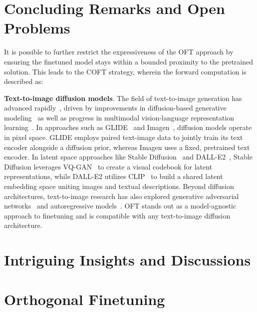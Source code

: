 \section{Concluding Remarks and Open Problems}

It is possible to further restrict the expressiveness of the OFT approach by ensuring the finetuned model stays within a bounded proximity to the pretrained solution. This leads to the COFT strategy, wherein the forward computation is described as:

\textbf{Text-to-image diffusion models}. The field of text-to-image generation has advanced rapidly~\cite{saharia2022photorealistic,ramesh2022hierarchical,rombach2022high,gu2022vector,nichol2022glide}, driven by improvements in diffusion-based generative modeling~\cite{ho2020denoising,song2021score,song2021denoising,dhariwal2021diffusion} as well as progress in multimodal vision-language representation learning~\cite{su2020vlbert,lu2019vilbert,radford2021learning,wang2021simvlm,li2022blip,li2023blip,alayrac2022flamingo,schuhmann2022laion}. In approaches such as GLIDE~\cite{nichol2022glide} and Imagen~\cite{saharia2022photorealistic}, diffusion models operate in pixel space. GLIDE employs paired text-image data to jointly train its text encoder alongside a diffusion prior, whereas Imagen uses a fixed, pretrained text encoder. In latent space approaches like Stable Diffusion~\cite{rombach2022high} and DALL-E2~\cite{ramesh2022hierarchical}, Stable Diffusion leverages VQ-GAN~\cite{esser2021taming} to create a visual codebook for latent representations, while DALL-E2 utilizes CLIP~\cite{radford2021learning} to build a shared latent embedding space uniting images and textual descriptions. Beyond diffusion architectures, text-to-image research has also explored generative adversarial networks~\cite{reed2016generative,zhang2017stackgan,xu2018attngan,li2019controllable} and autoregressive models~\cite{ramesh2021zero,ding2021cogview,wu2022nuwa,yuscaling}. OFT stands out as a model-agnostic approach to finetuning and is compatible with any text-to-image diffusion architecture.

\section{Intriguing Insights and Discussions}

\section{Orthogonal Finetuning}

